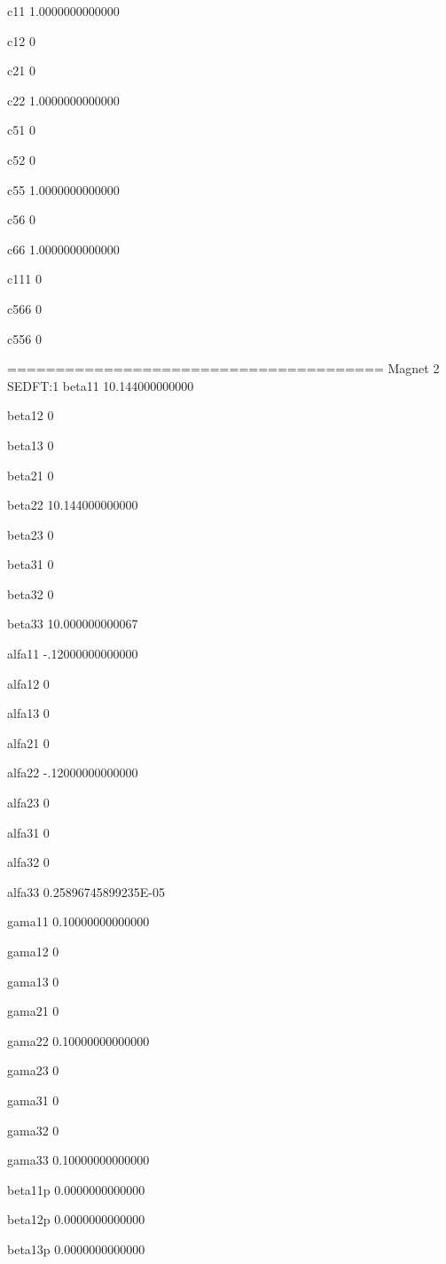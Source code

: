  c11
   1.0000000000000 
  
 c12
 0 
  
 c21
 0 
  
 c22
   1.0000000000000 
  
 c51
 0 
  
 c52
 0 
  
 c55
   1.0000000000000 
  
 c56
 0 
  
 c66
   1.0000000000000 
  
 c111
 0 
  
 c566
 0 
  
 c556
 0 
  
 =======================================
 Magnet  2  SEDFT:1         
 beta11 
   10.144000000000 
  
 beta12 
 0 
  
 beta13 
 0 
  
 beta21 
 0 
  
 beta22 
   10.144000000000 
  
 beta23 
 0 
  
 beta31 
 0 
  
 beta32 
 0 
  
 beta33 
   10.000000000067 
  
 alfa11 
  -.12000000000000 
  
 alfa12 
 0 
  
 alfa13 
 0 
  
 alfa21 
 0 
  
 alfa22 
  -.12000000000000 
  
 alfa23 
 0 
  
 alfa31 
 0 
  
 alfa32 
 0 
  
 alfa33 
  0.25896745899235E-05 
  
 gama11 
  0.10000000000000 
  
 gama12 
 0 
  
 gama13 
 0 
  
 gama21 
 0 
  
 gama22 
  0.10000000000000 
  
 gama23 
 0 
  
 gama31 
 0 
  
 gama32 
 0 
  
 gama33 
  0.10000000000000 
  
 beta11p
   0.0000000000000 
  
 beta12p
   0.0000000000000 
  
 beta13p
   0.0000000000000 
  
